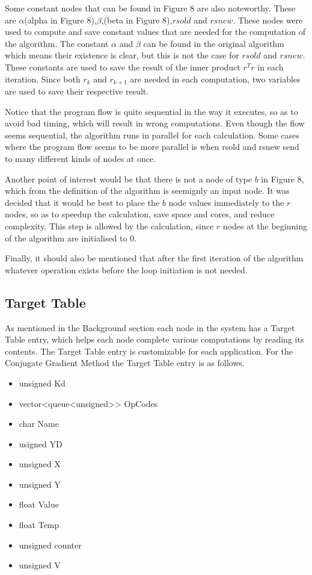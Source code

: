 \documentclass[12pt,a4paper]{article}
\begin{document}
Some constant nodes that can be found in Figure 8 are also noteworthy. These are $\alpha$(alpha in Figure 8),$\beta$,(beta in Figure 8),$rsold$ and $rsnew$. These nodes were used to compute and save constant values that are needed for the computation of the algorithm. The constant $\alpha$ and $\beta$ can be found in the original algorithm which means their existence is clear, but this is not the case for $rsold$ and $rsnew$. These constants are used to save the result of the inner product $r^Tr$ in each iteration. Since both $r_k$ and $r_{k+1}$ are needed in each computation, two variables are used to save their respective result.

Notice that the program flow is quite sequential in the way it executes, so as to avoid bad timing, which will result in wrong computations. Even though the flow seems sequential, the algorithm runs in parallel for each calculation. Some cases where the program flow seems to be more parallel is when rsold and rsnew send to many different kinds of nodes at once.

Another point of interest would be that there is not a node of type $b$ in Figure 8, which from the definition of the algorithm is seemignly an input node. It was decided that it would be best to place the $b$ node values immediately to the $r$ nodes, so as to speedup the calculation, save space and cores, and reduce complexity. This step is allowed by the calculation, since $r$ nodes at the beginning of the algorithm are initialised to 0.

Finally, it should also be mentioned that after the first iteration of the algorithm whatever operation exists before the loop initiation is not needed.
\subsection{Target Table}
As mentioned in the Background section each node in the system has a Target Table entry, which helps each node complete various computations by reading its contents. The Target Table entry is customizable for each application. For the Conjugate Gradient Method the Target Table entry is as follows.
\begin{itemize}
\item unsigned Kd
\item vector<queue<unsigned>> OpCodes
\item char Name
\item usigned YD
\item unsigned X
\item unsigned Y
\item float Value
\item float Temp
\item unsigned counter
\item unsigned V
\end{itemize}
\end{document}
